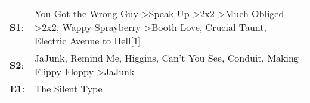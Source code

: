 \begin{supertabular}{p{0.03\textwidth}p{0.92\textwidth}}
 \textbf{S1}:  &  You Got the Wrong Guy\textsuperscript{} \textgreater \enspace Speak Up\textsuperscript{} \textgreater \enspace 2x2\textsuperscript{} \textgreater \enspace Much Obliged\textsuperscript{} \textgreater \enspace 2x2\textsuperscript{}, \enspace Wappy Sprayberry\textsuperscript{} \textgreater \enspace Booth Love\textsuperscript{}, \enspace Crucial Taunt\textsuperscript{}, \enspace Electric Avenue to Hell[1]\textsuperscript{}  \enspace  \\
 \textbf{S2}:  &                                                                                                                                                        JaJunk\textsuperscript{}, \enspace Remind Me\textsuperscript{}, \enspace Higgins\textsuperscript{}, \enspace Can't You See\textsuperscript{}, \enspace Conduit\textsuperscript{}, \enspace Making Flippy Floppy\textsuperscript{} \textgreater \enspace JaJunk\textsuperscript{}  \enspace  \\
 \textbf{E1}:  &                                                                                                                                                                                                                                                                                                                                                                                                       The Silent Type\textsuperscript{}  \enspace  \\
\end{supertabular}

